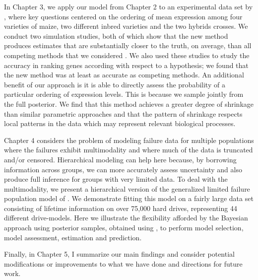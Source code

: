 In Chapter 3, we apply our model from Chapter 2 to an experimental data set by \citet{paschold}, where key questions centered on the ordering of mean expression among four varieties of maize, two different inbred varieties and the two hybrids crosses. We conduct two simulation studies, both of which show that the new method produces estimates that are substantially closer to the truth, on average, than all competing methods that we considered \citep{smyth2005limma,edger2010,deseq2014}. We also used these studies to study the accuracy in ranking genes according with respect to a hypothesis; we found that the new method was at least as accurate as competing methods. An additional benefit of our approach is it is able to directly assess the probability of a particular ordering of expression levels. This is because we sample jointly from the full posterior. We find that this method achieves a greater degree of shrinkage than similar parametric approaches and that the pattern of shrinkage respects local patterns in the data which may represent relevant biological processes.

Chapter 4 considers the problem of modeling failure data for multiple populations where the failures exhibit multimodality and where much of the data is truncated and/or censored. Hierarchical modeling can help here because, by borrowing information across groups, we can more accurately assess uncertainty and also produce full inference for groups with very limited data. To deal with the multimodality, we present a hierarchical version of the generalized limited failure population model of \citet{chan}. We demonstrate fitting this model on a fairly large data set consisting of lifetime information on over 75,000 hard drives, representing 44 different drive-models. Here we illustrate the flexibility afforded by the Bayesian approach using posterior samples, obtained using \citet{stan}, to perform model selection, model assessment, estimation and prediction.

Finally, in Chapter 5, I summarize our main findings and consider potential modifications or improvements to what we have done and directions for future work.

